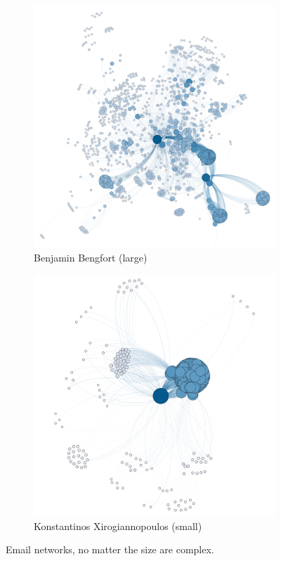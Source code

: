 \documentclass[11pt,letterpaper]{article}
\begin{document}
\begin{figure}[h]
	\centering
	\begin{subfigure}{0.49\textwidth}
		\centering
		\includegraphics[width=\textwidth]{figures/benjamin_descriptive.png}
		\caption{\textsf{Benjamin Bengfort (large)}}
        \label{fig:benjamin_descriptive}
	\end{subfigure} \hfill
	\begin{subfigure}{0.49\textwidth}
		\centering
		\includegraphics[width=\textwidth]{figures/kostas_descriptive.png}
		\caption{\textsf{Konstantinos Xirogiannopoulos (small)}}
        \label{fig:kostas_descriptive}
	\end{subfigure}
    \caption{\textsf{Email networks, no matter the size are complex.}}
    \label{fig:descriptive}
\end{figure}
\end{document}

